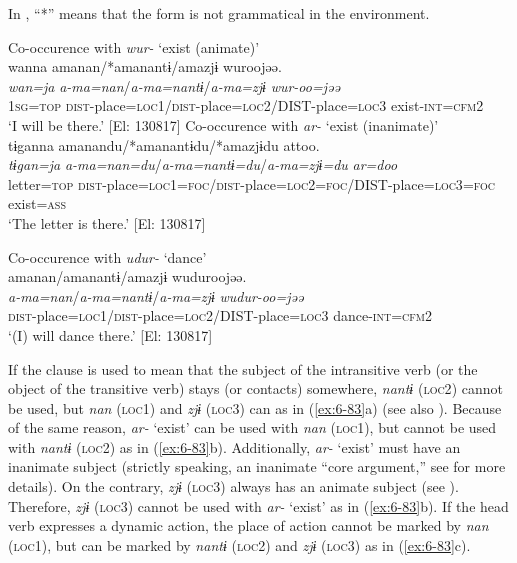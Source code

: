 In , “*” means that the form is not grammatical in the environment.

\ea\label{ex:6-83}
 \ea Co-occurence with \textit{wur-} ‘exist (animate)’\\

{\TM}
\glll wanna  amanan/*amanantɨ/amazjɨ  wuroojəə.\\
\textit{wan=ja}  \textit{a-ma=nan}/\textit{a-ma=nantɨ}/\textit{a-ma=zjɨ}  \textit{wur-oo=jəə}\\
    1\textsc{sg}=\textsc{top}  \textsc{dist}-place=\textsc{loc1}/\textsc{dist}-place=\textsc{loc2}/DIST-place=\textsc{loc3}  exist-\textsc{int}=\textsc{cfm}2\\
\glt    ‘I will be there.’ [El: 130817]
\ex Co-occurence with \textit{ar-} ‘exist (inanimate)’\\

{\TM}
\glll tɨganna  amanandu/*amanantɨdu/*amazjɨdu    attoo.  \\
\textit{tɨgan=ja}  \textit{a-ma=nan=du}/\textit{a-ma=nantɨ=du}/\textit{a-ma=zjɨ=du}   \textit{ar=doo}  \\
    letter=\textsc{top}  \textsc{dist}-place=\textsc{loc1}=\textsc{foc}/\textsc{dist}-place=\textsc{loc2}=\textsc{foc}/DIST-place=\textsc{loc3}=\textsc{foc}   exist=\textsc{ass}\\
\glt    ‘The letter is there.’ [El: 130817]

\ex Co-occurence with \textit{udur-} ‘dance’\\
{\TM}
\glll *amanan/amanantɨ/amazjɨ  wuduroojəə.\\
\textit{a-ma=nan}/\textit{a-ma=nantɨ}/\textit{a-ma=zjɨ}  \textit{wudur-oo=jəə}\\
    \textsc{dist}-place=\textsc{loc1}/\textsc{dist}-place=\textsc{loc2}/DIST-place=\textsc{loc3}  dance-\textsc{int}=\textsc{cfm}2\\
 \glt    ‘(I) will dance there.’ [El: 130817]
\z
\z

If the clause is used to mean that the subject of the intransitive verb (or the object of the transitive verb) stays (or contacts) somewhere, \textit{nantɨ} (\textsc{loc2}) cannot be used, but \textit{nan} (\textsc{loc1}) and \textit{zjɨ} (\textsc{loc3}) can as in (\ref{ex:6-83}a) (see also ). Because of the same reason, \textit{ar-} ‘exist’ can be used with \textit{nan} (\textsc{loc1}), but cannot be used with \textit{nantɨ} (\textsc{loc2}) as in (\ref{ex:6-83}b). Additionally, \textit{ar-} ‘exist’ must have an inanimate subject (strictly speaking, an inanimate “core argument,” see  for more details). On the contrary, \textit{zjɨ} (\textsc{loc3}) always has an animate subject (see ). Therefore, \textit{zjɨ} (\textsc{loc3}) cannot be used with \textit{ar-} ‘exist’ as in (\ref{ex:6-83}b). If the head verb expresses a dynamic action, the place of action cannot be marked by \textit{nan} (\textsc{loc1}), but can be marked by \textit{nantɨ} (\textsc{loc2}) and \textit{zjɨ} (\textsc{loc3}) as in (\ref{ex:6-83}c).

